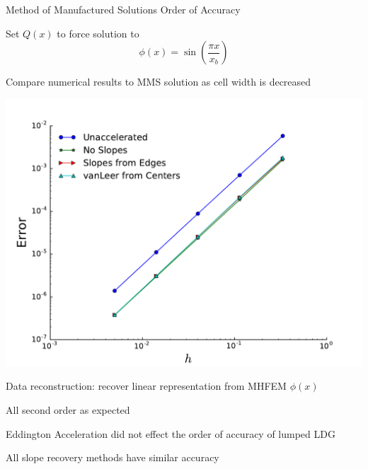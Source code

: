 \documentclass[10pt]{beamer}
\begin{document}
\begin{frame}{Method of Manufactured Solutions Order of Accuracy} 

	\footnotesize
	Set $Q(x)$ to force solution to 
	\begin{equation*}
		\phi(x) = \sin\left(\frac{\pi x}{x_b}\right)
	\end{equation*}

	Compare numerical results to MMS solution as cell width is decreased 

	\pause
	\centerline{\includegraphics[width=.45\paperwidth]{figs/ooa.pdf}}

	\pause
	Data reconstruction: recover linear representation from MHFEM $\phi(x)$

	\pause 
	All second order as expected 

	\pause
	Eddington Acceleration did not effect the order of accuracy of lumped LDG 

	\pause 
	All slope recovery methods have similar accuracy 

\end{frame}
\end{document}
